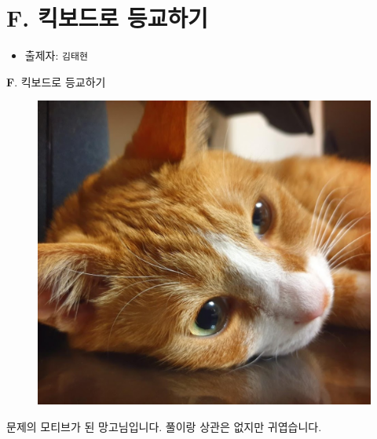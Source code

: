 \section{F. 킥보드로 등교하기}

\begin{frame} %
    \begin{itemize}
        \item 출제자: \texttt{김태현}
    \end{itemize}
\end{frame}

\begin{frame}{\textbf{F}. 킥보드로 등교하기}
    \begin{figure}[h!]
        \centering
        \includegraphics[width=0.35\linewidth]{../images/mango/mango_sleepy.png}
    \end{figure}
    
    문제의 모티브가 된 망고님입니다. 풀이랑 상관은 없지만 귀엽습니다.
\end{frame}